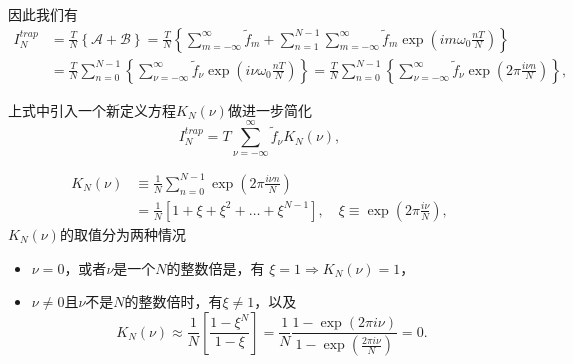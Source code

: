 因此我们有
\begin{equation}
\begin{split}
  \label{eq:ninc-cc-trape-approx-m}
  I_{N}^{trap} & = \frac{T}{N}
  \left\{
  \mathcal{A} + \mathcal{B}
  \right\} = \frac{T}{N}
  \left\{
  \sum_{m=-\infty}^{\infty} \tilde{f}_{m}
  + \sum_{n=1}^{N-1} \sum_{m=-\infty}^{\infty} \tilde{f}_{m} \exp \left( i m \omega_{0} \frac{n T}{N} \right)
  \right\} \\
  & = \frac{T}{N} \sum_{n=0}^{N-1}
  \left\{
  \sum_{\nu = - \infty}^{\infty} \tilde{f}_{\nu} \exp
  \left(
  i \nu \omega_{0} \frac{n T}{N}
  \right)
  \right\}  = \frac{T}{N} \sum_{n=0}^{N-1}
  \left\{
  \sum_{\nu = - \infty}^{\infty} \tilde{f}_{\nu} \exp
  \left(
  2 \pi \frac{i \nu n }{N}
  \right)
  \right\},
\end{split}
\end{equation}

上式中引入一个新定义方程$K_{N} \left( \nu \right)$做进一步简化
\begin{equation}
  \label{eq:ninc-cc-trape-approx-knnu}
  I_{N}^{trap} = T \sum_{\nu = -\infty}^{\infty}
  \tilde{f}_{\nu} K_{N} \left( \nu \right),
\end{equation}

\begin{equation}
  \label{eq:ninc-cc-trape-approx-knnu-def}
  \begin{split}
    K_{N} \left( \nu \right) & \equiv \frac{1}{N} \sum_{n=0}^{N-1} \exp \left( 2 \pi \frac{i \nu n}{N} \right) \\
    & = \frac{1}{N} \left[ 1 + \xi + \xi^{2} + \ldots + \xi^{N-1} \right], \quad \xi \equiv \exp \left( 2 \pi \frac{i \nu}{N} \right),
  \end{split}
\end{equation}
$K_{N} \left( \nu \right)$的取值分为两种情况
\begin{itemize}
  \item $\nu=0$，或者$\nu$是一个$N$的整数倍是，有 $\xi = 1 \Rightarrow K_{N} \left( \nu \right) = 1$，
  \item $\nu \neq 0$且$\nu$不是$N$的整数倍时，有$\xi \neq 1$，以及
  \begin{equation*}
    K_{N} \left( \nu \right) \approx \frac{1}{N} \left[
    \frac{
    1 - \xi^{N}
    }{
    1 - \xi
    }
    \right] = \frac{1}{N} \frac{
    1 - \exp \left( 2 \pi i \nu \right)
    }{
    1 - \exp \left( \frac{2 \pi i \nu }{N}\right)
    } = 0.
  \end{equation*}
\end{itemize}

